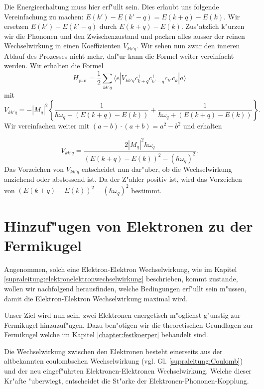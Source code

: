 \begin{refsection}
Die Energieerhaltung muss hier erf"ullt sein. 
Dies erlaubt uns folgende Vereinfachung zu machen:
$E(k')-E(k'-q) = E(k+q)-E(k)$. Wir ersetzen $E(k')-E(k'-q)$ durch $E(k+q)-E(k)$.
Zus"atzlich k"urzen wir die Phononen und den Zwischenzustand und packen
alles ausser der reinen Wechselwirkung in einen Koeffizienten $V_{kk'q}$.
Wir sehen nun zwar den inneren Ablauf des Prozesses nicht mehr, daf"ur kann die Formel
weiter vereinfacht werden.
Wir erhalten die Formel
\begin{equation}
H_{\text{pair}}=
\frac{1}{2}
\sum \limits_{kk'q} 
\langle e|V_{kk'q}c^+_{k+q}c^+_{k'-q}c_{k'}c_k|a \rangle
\label{supraleitung:WechselwirkungKurz}
\end{equation}
mit
\begin{equation}
V_{kk'q} = - |M_q|^2 \left\{
\frac{1}{\hbar\omega_q-(E(k+q)-E(k))}
+
\frac{1}{\hbar\omega_q+(E(k+q)-E(k))}
\right\}
\label{supraleitung:WechselwirkungVkk'q}.
\end{equation}
Wir vereinfachen weiter mit $(a-b)\cdot (a+b) = a^2-b^2$ und erhalten

\begin{equation}
V_{kk'q} =
\frac
{2|M_q|^2\hbar\omega_q}
{(E(k+q)-E(k))^2-(\hbar\omega_q)^2}
\label{supraleitung:Wechselwirkung_Vkk'q_Kurz}.
\end{equation}
Das Vorzeichen von $V_{kk'q}$ entscheidet nun dar"uber, ob die Wechselwirkung
anziehend oder abstossend ist. Da der Z"ahler positiv ist, wird das Vorzeichen von $(E(k+q)-E(k))^2-(\hbar\omega_q)^2$ bestimmt.

\section{Hinzuf"ugen von Elektronen zu der Fermikugel}
Angenommen, solch eine Elektron-Elektron Wechselwirkung, wie im Kapitel
\ref{supraleitung:elektronelektronwechselwirkung} beschrieben, kommt zustande,
wollen wir nachfolgend herausfinden, welche Bedingungen erf"ullt sein m"ussen, damit die
Elektron-Elektron Wechselwirkung maximal wird.

Unser Ziel wird nun sein, zwei Elektronen energetisch m"oglichst g"unstig zur  Fermikugel hinzuzuf"ugen.
Dazu ben"otigen wir die theoretischen Grundlagen zur Fermikugel welche im Kapitel
\ref{chapter:festkoerper} behandelt sind.


Die Wechselwirkung zwischen den Elektronen besteht einerseits aus der altbekannten coulombschen
Wechselwirkung (vgl. Gl. \ref{supraleitung:Coulomb}) und der neu eingef"uhrten
Elektronen-Elektronen Wechselwirkung.
Welche dieser Kr"afte "uberwiegt, entscheidet die St"arke der Elektronen-Phononen-Kopplung.


\end{refsection}
